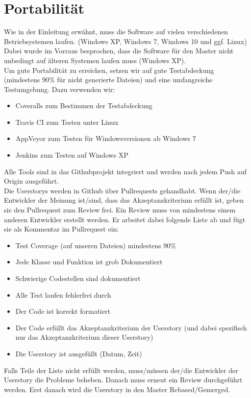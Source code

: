 \documentclass[accentcolor=tud9c,12pt,paper=a4]{tudreport}
\begin{document}
		\section{Portabilität}
		Wie in der Einleitung erwähnt, muss die Software auf vielen verschiedenen 
		Betriebsystemen laufen. (Windows XP, Windows 7, Windows 10 und ggf. Linux)
		Dabei wurde im Vorraus besprochen, dass die Software für den Master nicht 
		unbedingt auf älteren Systemen laufen muss (Windows XP).
		\\[5pt]
		Um gute Portabilität zu erreichen, setzen wir auf gute Testabdeckung 
			(mindestens 90\% für nicht generierte Dateien) und eine umfangreiche 
			Testumgebung. Dazu verwenden wir:
			\begin{itemize}	
				\item Coveralls zum Bestimmen der Testabdeckung
				\item Travis CI zum Testen unter Linux
				\item AppVeyor zum Testen für Windowsversionen ab Windows 7
				\item Jenkins zum Testen auf Windows XP
			\end{itemize}
			Alle Tools sind in das Githubprojekt integriert und werden nach jedem Push auf 
			Origin ausgeführt.
			\\[5pt]
			Die Userstorys werden in Github über Pullrequests gehandhabt. Wenn der/die 
			Entwickler der Meinung ist/sind, dass das Akzeptanzkriterium erfüllt ist, geben sie 
			den Pullrequest zum Review frei. Ein Review muss von mindestens einem anderen Entwickler erstellt werden. Er arbeitet dabei folgende Liste ab und fügt sie als Kommentar im Pullrequest ein:
			\begin{itemize}	
				\item Test Coverage (auf unseren Dateien) mindestens 90\%
				\item Jede Klasse und Funktion ist grob Dokumentiert
				\item Schwierige Codestellen sind dokumentiert
				\item Alle Test laufen fehlerfrei durch
				\item Der Code ist korrekt formatiert
				\item Der Code erfüllt das Akzeptanzkriterium der Userstory (und dabei spezifisch nur das Akzeptanzkriterium dieser Userstory)
				\item Die Userstory ist ausgefüllt (Datum, Zeit)
			\end{itemize}
			Falls Teile der Liste nicht erfüllt werden, muss/müssen der/die Entwickler 
			der Userstory die Probleme beheben. Danach muss erneut ein Review 
			durchgeführt werden. Erst danach wird die Userstory in den Master Rebased/Gemerged.
				
\end{document}
